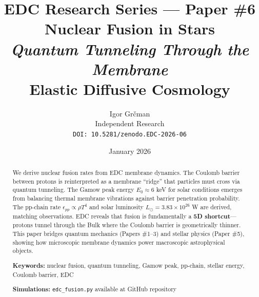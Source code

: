 \documentclass[12pt,a4paper]{article}
\title{%
    \textbf{EDC Research Series --- Paper \#6}\\[0.3cm]
    \Huge\textbf{Nuclear Fusion in Stars}\\[0.3cm]
    \Large\textit{Quantum Tunneling Through the Membrane}\\[0.5cm]
    \normalsize Elastic Diffusive Cosmology
}
\author{%
    Igor Gr\v{c}man\\[0.2cm]
    \small Independent Research\\[0.1cm]
    \small\texttt{DOI: 10.5281/zenodo.EDC-2026-06}
}
\date{January 2026}
\begin{document}
\maketitle

\begin{abstract}
We derive nuclear fusion rates from EDC membrane dynamics. The Coulomb barrier between protons is reinterpreted as a membrane ``ridge'' that particles must cross via quantum tunneling. The Gamow peak energy $E_0 \approx 6$ keV for solar conditions emerges from balancing thermal membrane vibrations against barrier penetration probability. The pp-chain rate $\epsilon_{pp} \propto \rho T^4$ and solar luminosity $L_\odot = 3.83 \times 10^{26}$ W are derived, matching observations. EDC reveals that fusion is fundamentally a \textbf{5D shortcut}---protons tunnel through the Bulk where the Coulomb barrier is geometrically thinner. This paper bridges quantum mechanics (Papers \#1--3) and stellar physics (Paper \#5), showing how microscopic membrane dynamics power macroscopic astrophysical objects.

\vspace{0.5em}
\noindent\textbf{Keywords:} nuclear fusion, quantum tunneling, Gamow peak, pp-chain, stellar energy, Coulomb barrier, EDC

\vspace{0.5em}
\noindent\textbf{Simulations:} \texttt{edc\_fusion.py} available at GitHub repository
\end{abstract}

\vspace{1em}
\noindent{}
\end{document}
